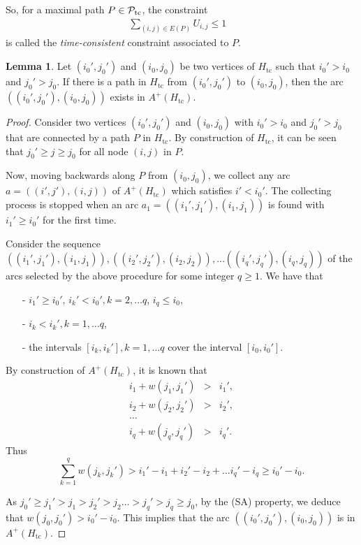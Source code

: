\documentclass[11pt]{article}
\theoremstyle{plain}%
\theoremstyle{definition} \newtheorem{lem}{Lemma}[section]
\theoremstyle{definition} \newtheorem{claim}{Claim}[lem]
\theoremstyle{definition} \newtheorem{theorem}{Theorem}[section]
\theoremstyle{definition} \newtheorem{exo}{Exercice n$^\circ$}
\theoremstyle{definition} \newtheorem{quest}{}[exo]
\theoremstyle{definition} \newtheorem{sousquest}{}[quest]
\theoremstyle{remark}
\theoremstyle{definition}
\begin{document}
So, for a maximal path $P \in {\cal P}_\textrm{tc}$,  the constraint 
\begin{eqnarray}
 \sum_{(i, j) \in E(P)} U_{i,j} \le 1 &\label{clique_timecons_P}
\end{eqnarray}
is called the {\it time-consistent} constraint associated to $P$. 
\begin{lem}\label{lem_arc_time}
Let $(i_0', j_0') $  and $(i_0, j_0) $ be two vertices of $H_\textrm{tc}$ such that
$i_0' > i_0 $ and $j_0' > j_0 $. If there is a path in $H_\textrm{tc}$
from $(i_0', j_0') $ to $(i_0, j_0) $, then the arc 
$((i_0', j_0') , (i_0, j_0)) $ exists in $A^+(H_\textrm{tc})$.
\end{lem}
\begin{proof}
Consider two vertices $(i_0', j_0') $ and $(i_0, j_0) $ with $i_0' > i_0 $ and $j_0' > j_0 $
that are connected by a path $P$ in $H_\textrm{tc}$.
By construction of $H_\textrm{tc}$, it can be seen that $j_0' \geq j \geq  j_0 $
for all node $(i, j)$ in $P$.

Now, moving backwards along $P$ from $(i_0, j_0) $, we collect any arc 
$a= ((i',j'),(i,j))$ of $A^+(H_\textrm{tc})$ which satisfies
$i' <i_0'$. The collecting process is stopped when an arc $a_1= ((i_1',j_1'),(i_1,j_1))$
is found with $i_1' \geq i_0'$ for the first time.

Consider the sequence $ ((i_1',j_1'),(i_1,j_1)), ((i_2',j_2'),(i_2,j_2)), \dots ((i_q',j_q'),(i_q,j_q))$
of the arcs selected by the above procedure for some integer $q \ge 1$.
We have that 
\begin{itemize} 
\item [-] $ i_1' \geq i_0'$, $i_k' < i_0', k=2, \dots q$, $i_q \leq i_0$,
\item [-] $i_k < i_k', k=1, \dots q$,
\item [-] the intervals $[i_k,i_k'], k=1, \dots q$ cover the interval $[i_0,i_0']$.
\end{itemize}

By construction of $A^+(H_\textrm{tc})$, it is known that
\begin{displaymath}
\begin{array}{lcr}
i_1 + w(j_1, j_1') &> & i_1', \\
i_2 + w(j_2, j_2') & >& i_2', \\
\dots \\
i_q + w(j_q, j_q') & >& i_q'. 
\end{array}
\end{displaymath}
Thus 
$$ \sum_{k=1}^{q}{w(j_k, j_k') } > i_1' -  i_1 + i_2' - i_2 + \dots i_q' - i_q \geq i_0' - i_0.$$

As  $j_0' \geq j_1' > j_1 > j_2' >j_2 \dots > j_q' >j_q \geq j_0$,
by the (SA) property, we deduce that  $ w(j_0, j_0')  > i_0' - i_0$.
This implies that the arc $((i_0', j_0') , (i_0, j_0)) $ is in  $A^+(H_\textrm{tc})$.
\end{proof}
\end{document}
